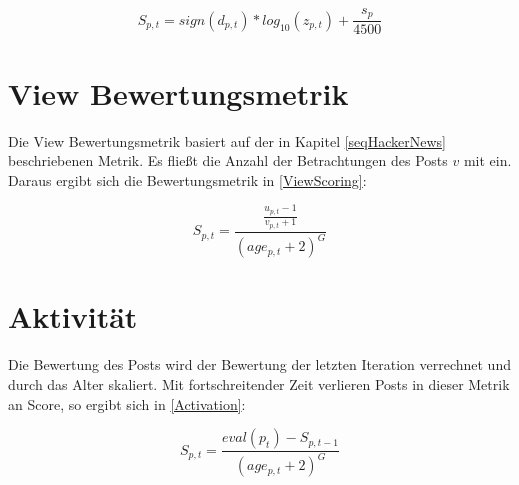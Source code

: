 \begin{equation}
\label{RedditHot}
S_{p,t} = sign(d_{p,t}) * log_{10}(z_{p,t}) + \frac{s_{p}}{4500}
\end{equation}



\section{View Bewertungsmetrik}

Die View Bewertungsmetrik basiert auf der in Kapitel \ref{seqHackerNews} beschriebenen Metrik. Es fließt die Anzahl der Betrachtungen des Posts $v$ mit ein. Daraus ergibt sich die Bewertungsmetrik in \ref{ViewScoring}:

\begin{equation}
\label{ViewScoring}
S_{p,t} = \frac{\frac{u_{p,t} - 1}{v_{p,t} + 1}}{(age_{p,t} + 2)^{G}}
\end{equation}


\section{Aktivität}

Die Bewertung des Posts wird der Bewertung der letzten Iteration verrechnet und durch das Alter skaliert. Mit fortschreitender Zeit verlieren Posts in dieser Metrik an Score, so ergibt sich in \ref{Activation}:


\begin{equation}
\label{Activation}
S_{p,t} = \frac{eval(p_{t}) - S_{p,t-1}}{(age_{p,t} + 2)^{G}}
\end{equation}

	